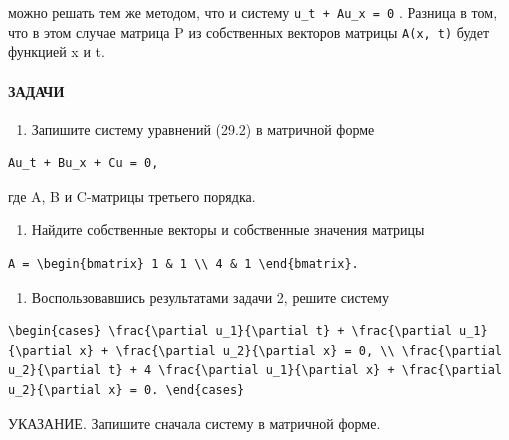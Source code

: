 \documentclass[
  ukrainian,
]{article}
\providecommand{\tightlist}{%
  \setlength{\itemsep}{0pt}\setlength{\parskip}{0pt}}
\begin{document}
можно решать тем же методом, что и систему \texttt{u\_t\ +\ Au\_x\ =\ 0}
. Разница в том, что в этом случае матрица P из собственных векторов
матрицы \texttt{A(x,\ t)} будет функцией x и t.

\paragraph{ЗАДАЧИ}\label{ux437ux430ux434ux430ux447ux438-1}

\begin{enumerate}
\def\labelenumi{\arabic{enumi}.}
\tightlist
\item
  Запишите систему уравнений (29.2) в матричной форме
\end{enumerate}

\begin{verbatim}
Au_t + Bu_x + Cu = 0,
\end{verbatim}

где A, B и C-матрицы третьего порядка.

\begin{enumerate}
\def\labelenumi{\arabic{enumi}.}
\setcounter{enumi}{1}
\tightlist
\item
  Найдите собственные векторы и собственные значения матрицы
\end{enumerate}

\begin{verbatim}
A = \begin{bmatrix} 1 & 1 \\ 4 & 1 \end{bmatrix}.
\end{verbatim}

\begin{enumerate}
\def\labelenumi{\arabic{enumi}.}
\setcounter{enumi}{2}
\tightlist
\item
  Воспользовавшись результатами задачи 2, решите систему
\end{enumerate}

\begin{verbatim}
\begin{cases} \frac{\partial u_1}{\partial t} + \frac{\partial u_1}{\partial x} + \frac{\partial u_2}{\partial x} = 0, \\ \frac{\partial u_2}{\partial t} + 4 \frac{\partial u_1}{\partial x} + \frac{\partial u_2}{\partial x} = 0. \end{cases}
\end{verbatim}

УКАЗАНИЕ. Запишите сначала систему в матричной форме.
\end{document}
